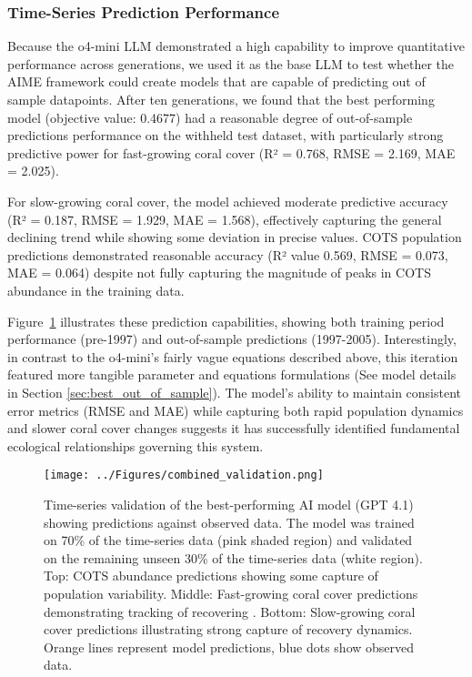 \subsubsection{Time-Series Prediction Performance}

Because the o4-mini LLM demonstrated a high capability to improve quantitative performance across generations, we used it as the base LLM to test whether the AIME framework could create models that are capable of predicting out of sample datapoints. After ten generations, we found that the best performing model (objective value: 0.4677) had a reasonable degree of out-of-sample predictions performance on the withheld test dataset, with particularly strong predictive power for fast-growing coral cover (R² = 0.768, RMSE = 2.169, MAE = 2.025). 

For slow-growing coral cover, the model achieved moderate predictive accuracy (R² = 0.187, RMSE = 1.929, MAE = 1.568), effectively capturing the general declining trend while showing some deviation in precise values. COTS population predictions demonstrated reasonable accuracy (R² value 0.569, RMSE = 0.073, MAE = 0.064) despite not fully capturing the magnitude of peaks in COTS abundance in the training data.

Figure~\ref{fig:validation_combined} illustrates these prediction capabilities, showing both training period performance (pre-1997) and out-of-sample predictions (1997-2005). Interestingly, in contrast to the o4-mini's fairly vague equations described above, this iteration featured more tangible parameter and equations formulations (See model details in Section \ref{sec:best_out_of_sample}). The model's ability to maintain consistent error metrics (RMSE and MAE) while capturing both rapid population dynamics and slower coral cover changes suggests it has successfully identified fundamental ecological relationships governing this system.


\begin{figure}[H]
\centering
\texttt{[image: ../Figures/combined\_validation.png]}
\caption{Time-series validation of the best-performing AI model (GPT 4.1) showing predictions against observed data. The model was trained on 70\% of the time-series data (pink shaded region) and validated on the remaining unseen 30\% of the time-series data (white region). Top: COTS abundance predictions showing some capture of population variability. Middle: Fast-growing coral cover predictions demonstrating tracking of recovering . Bottom: Slow-growing coral cover predictions illustrating strong capture of recovery dynamics. Orange lines represent model predictions, blue dots show observed data.}
\label{fig:validation_combined}
\end{figure}
